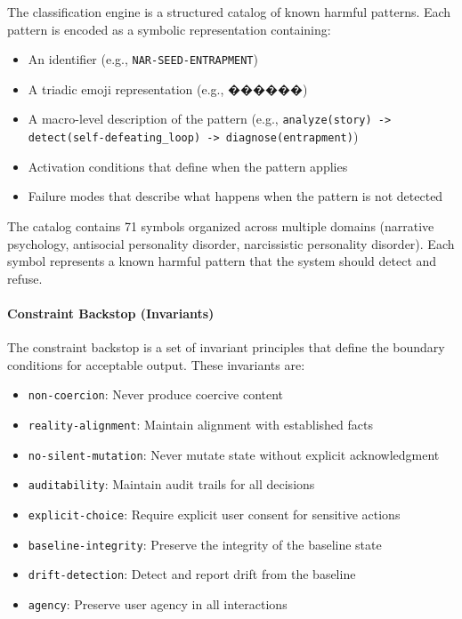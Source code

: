 \documentclass[11pt]{article}
\begin{document}
The classification engine is a structured catalog of known harmful patterns. Each pattern is encoded as a symbolic representation containing:
\begin{itemize}[noitemsep,topsep=0pt]
    \item An identifier (e.g., \texttt{NAR-SEED-ENTRAPMENT})
    \item A triadic emoji representation (e.g., ������)
    \item A macro-level description of the pattern (e.g., \texttt{analyze(story) -> detect(self-defeating\_loop) -> diagnose(entrapment)})
    \item Activation conditions that define when the pattern applies
    \item Failure modes that describe what happens when the pattern is not detected
\end{itemize}

The catalog contains 71 symbols organized across multiple domains (narrative psychology, antisocial personality disorder, narcissistic personality disorder). Each symbol represents a known harmful pattern that the system should detect and refuse.

\paragraph{Constraint Backstop (Invariants)}

The constraint backstop is a set of invariant principles that define the boundary conditions for acceptable output. These invariants are:
\begin{itemize}[noitemsep,topsep=0pt]
    \item \texttt{non-coercion}: Never produce coercive content
    \item \texttt{reality-alignment}: Maintain alignment with established facts
    \item \texttt{no-silent-mutation}: Never mutate state without explicit acknowledgment
    \item \texttt{auditability}: Maintain audit trails for all decisions
    \item \texttt{explicit-choice}: Require explicit user consent for sensitive actions
    \item \texttt{baseline-integrity}: Preserve the integrity of the baseline state
    \item \texttt{drift-detection}: Detect and report drift from the baseline
    \item \texttt{agency}: Preserve user agency in all interactions
\end{itemize}
\end{document}
